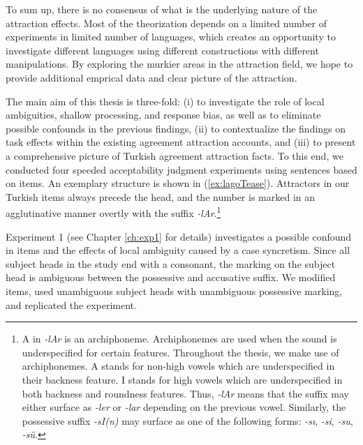 To sum up, there is no consensus of what is the underlying nature of the attraction effects. Most of the theorization depends on a limited number of experiments in limited number of languages, which creates an opportunity to investigate different languages using different constructions with different manipulations. By exploring the murkier areas in the attraction field, we hope to provide additional emprical data and clear picture of the attraction. 

The main aim of this thesis is three-fold: (i) to investigate the role of local ambiguities, shallow processing, and response bias, as well as to eliminate possible confounds in the previous findings, (ii) to contextualize the findings on task effects within the existing agreement attraction accounts, and (iii) to present a comprehensive picture of Turkish agreement attraction facts. To this end, we conducted four speeded acceptability judgment experiments using sentences based on \cites{LagoEtAl2019} items. An exemplary structure is shown in (\ref{ex:lagoTease}). Attractors in our Turkish items always precede the head, and the number is marked in an agglutinative manner overtly with the suffix \textit{-lAr}.\footnote{A in \emph{-lAr} is an archiphoneme. Archiphonemes are used when the sound is underspecified for certain features. Throughout the thesis, we make use of archiphonemes. A stands for non-high vowels which are underspecified in their backness feature. I stands for high vowels which are underspecified in both backness and roundness features. Thus, \emph{-lAr} means that the suffix may either surface as \emph{-ler} or \emph{-lar} depending on the previous vowel. Similarly, the possessive suffix \emph{-sI(n)} may surface as one of the following forms: \emph{-s{\i}}, \emph{-si}, \emph{-su}, \emph{-s\"{u}}.}

\z

Experiment 1 (see Chapter \ref{ch:exp1} for details) investigates a possible confound in \cites{LagoEtAl2019} items and the effects of local ambiguity caused by a case syncretism. Since all subject heads in the \cites{LagoEtAl2019} study end with a consonant, the marking on the subject head is ambiguous between the possessive and accusative suffix. We modified \cites{LagoEtAl2019} items, used unambiguous subject heads with unambiguous possessive marking, and replicated the \cites{LagoEtAl2019} experiment.

